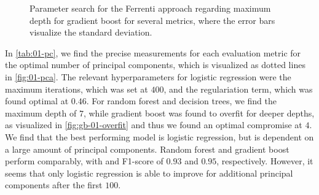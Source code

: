 \clearpage

\begin{table}[!ht]
\centering
\caption{A table of the optimal number of principal components and the respective scores (standard deviation) for the Ferrenti approach, as visualized in the dash-dotted line in \autoref{fig:01-pca}.}
\label{tab:01-pc}
\noindent{}
\end{table}



\begin{wrapfigure}{R}{0.5\textwidth}

  \begin{subfigure}[b]{1.0\textwidth}
  
  \end{subfigure}

  \begin{subfigure}[b]{1.0\textwidth}
  
  \end{subfigure}
  \vspace*{-130mm}
  \caption{Parameter search for the Ferrenti approach regarding maximum depth for gradient boost for several metrics, where the error bars visualize the standard deviation.}
  \label{fig:gb-01-overfit}
\end{wrapfigure}

\noindent In \autoref{tab:01-pc}, we find the precise measurements for each evaluation metric for the optimal number of principal components, which is visualized as dotted lines in \autoref{fig:01-pca}. The relevant hyperparameters for logistic regression were the maximum iterations, which was set at $400$, and the regulariation term, which was found optimal at $0.46$. For random forest and decision trees, we find the maximum depth of $7$, while gradient boost was found to overfit for deeper depths, as visualized in \autoref{fig:gb-01-overfit} and thus we found an optimal compromise at $4$. We find that the best performing model is logistic regression, but is dependent on a large amount of principal components. Random forest and gradient boost perform comparably, with and F1-score of $0.93$ and $0.95$, respectively. However, it seems that only logistic regression is able to improve for additional principal components after the first $100$.



